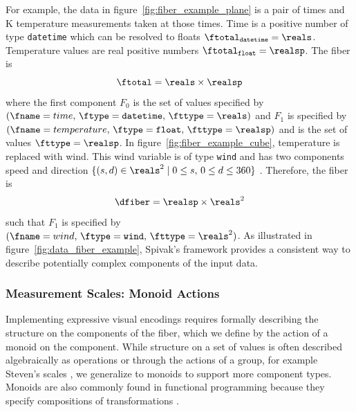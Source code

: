 \documentclass[../main.tex]{subfiles}
\begin{document}
For example, the data in figure~\ref{fig:fiber_example_plane} is a pair of times and \textdegree K temperature measurements taken at those times. Time is a positive number of type \texttt{datetime} which can be resolved to floats $\ftotal_{\texttt{datetime}}= \reals$. Temperature values are real positive numbers $\ftotal_{\texttt{float}} = \realsp$. The fiber is 
\begin{equation}
    \ftotal =  \reals \times \realsp 
\end{equation} 
where the first component $F_0$ is the set of values specified by $(\fname=time,\, \ftype=\texttt{datetime},\, \fttype=\reals)$ and $F_1$ is specified by $(\fname=temperature,\, \ftype=\texttt{float},\, \fttype=\realsp)$ and is the set of values $\fttype=\realsp$. In figure~\ref{fig:fiber_example_cube}, temperature is replaced with wind. This wind variable is of type \texttt{wind} and has two components speed and direction $\{(s,d) \in \reals^{2} \mid  0\leq s,\, 0 \leq d \leq 360\}$ . Therefore, the fiber is 
\begin{equation}
    \dfiber = \realsp \times \reals^{2}
\end{equation} 
such that $F_1$ is specified by $(\fname = wind,\, \ftype = \texttt{wind},\, \fttype=\reals^{2})$.  As illustrated in figure~\ref{fig:data_fiber_example}, Spivak's framework provides a consistent way to describe potentially complex components of the input data. 

\subsubsection{Measurement Scales: Monoid Actions}
\label{sec:data_monoid}
Implementing expressive visual encodings requires formally describing the structure on the components of the fiber, which we define by the action of a monoid on the component. While structure on a set of values is often described algebraically as operations or through the actions of a group, for example Steven's scales \cite{stevensTheoryScalesMeasurement1946}, we generalize to monoids to support more component types. Monoids are also commonly found in functional programming because they specify compositions of transformations \cite{yorgeyMonoidsThemeVariations, stievenMonadJustMonoid2020}. 
\end{document}
